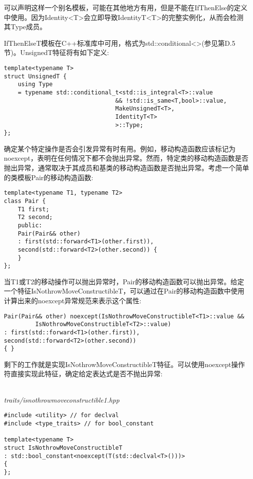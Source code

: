 可以声明这样一个别名模板，可能在其他地方有用，但是不能在IfThenElse的定义中使用。因为Identity<T>会立即导致IdentityT<T>的完整实例化，从而会检测其Type成员。

IfThenElseT模板在C++标准库中可用，格式为std::conditional<>(参见第D.5节)。UnsignedT特征将有如下定义:

\begin{lstlisting}[style=styleCXX]
template<typename T>
struct UnsignedT {
	using Type
	= typename std::conditional_t<std::is_integral<T>::value
								&& !std::is_same<T,bool>::value,
								MakeUnsignedT<T>,
								IdentityT<T>
								>::Type;
};
\end{lstlisting}


确定某个特定操作是否会引发异常有时有用。例如，移动构造函数应该标记为noexcept，表明在任何情况下都不会抛出异常。然而，特定类的移动构造函数是否抛出异常，通常取决于其成员和基类的移动构造函数是否抛出异常。考虑一个简单的类模板Pair的移动构造函数:

\begin{lstlisting}[style=styleCXX]
template<typename T1, typename T2>
class Pair {
	T1 first;
	T2 second;
	public:
	Pair(Pair&& other)
	: first(std::forward<T1>(other.first)),
	second(std::forward<T2>(other.second)) {
	}
};
\end{lstlisting}

当T1或T2的移动操作可以抛出异常时，Pair的移动构造函数可以抛出异常。给定一个特征IsNothrowMoveConstructibleT，可以通过在Pair的移动构造函数中使用计算出来的noexcept异常规范来表示这个属性:

\begin{lstlisting}[style=styleCXX]
Pair(Pair&& other) noexcept(IsNothrowMoveConstructibleT<T1>::value &&
		 IsNothrowMoveConstructibleT<T2>::value)
: first(std::forward<T1>(other.first)),
second(std::forward<T2>(other.second))
{ }
\end{lstlisting}

剩下的工作就是实现IsNothrowMoveConstructibleT特征。可以使用noexcept操作符直接实现此特征，确定给定表达式是否不抛出异常:

\hspace*{\fill} \\ %
\noindent
\textit{traits/isnothrowmoveconstructible1.hpp}
\begin{lstlisting}[style=styleCXX]
#include <utility> // for declval
#include <type_traits> // for bool_constant

template<typename T>
struct IsNothrowMoveConstructibleT
: std::bool_constant<noexcept(T(std::declval<T>()))>
{
};
\end{lstlisting}

